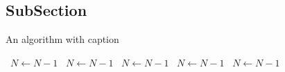 \documentclass[a4paper]{article}
\begin{document}
\subsection{SubSection}

\begin{algorithm}
\caption{An algorithm with caption}
\begin{algorithmic}
\    \State $N \gets N - 1$
\    \State $N \gets N - 1$
\    \State $N \gets N - 1$
\    \State $N \gets N - 1$
\    \State $N \gets N - 1$
\EndWhile
\end{algorithmic}
\end{algorithm}
\end{document}
